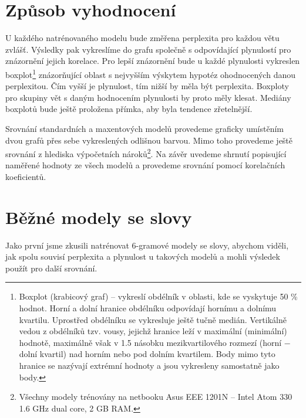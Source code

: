 \documentclass[12pt,a4paper]{report}
\begin{document}
\section{Způsob vyhodnocení}
U každého natrénovaného modelu bude změřena perplexita pro každou větu zvlášť. Výsledky pak vykreslíme do grafu společně s odpovídající plynulostí pro znázornění jejich korelace. Pro lepší znázornění bude u každé plynulosti vykreslen box\-plot\footnote{Box\-plot (krabicový graf) -- vykreslí obdélník v oblasti, kde se vyskytuje 50 \% hodnot. Horní a dolní hranice obdélníku odpovídají hornímu a dolnímu kvartilu. Uprostřed obdélníku se vykresluje ještě tučně medián. Vertikálně vedou z obdélníků tzv. vousy, jejichž hranice leží v maximální (minimální) hodnotě, maximálně však v 1.5 násobku mezikvartilového rozmezí (horní $-$ dolní kvartil) nad horním nebo pod dolním kvartilem. Body mimo tyto hranice se nazývají extrémní hodnoty a jsou vykresleny samostatně jako body.} znázorňující oblast s nejvyšším výskytem hypotéz ohodnocených danou perplexitou. Čím vyšší je plynulost, tím nižší by měla být perplexita. Box\-ploty pro skupiny vět s daným hodnocením plynulosti by proto měly klesat. Mediány box\-plotů bude ještě proložena přímka, aby byla tendence zřetelnější.

Srovnání standardních a maxentových modelů provedeme graficky umístěním dvou grafů přes sebe vykreslených odlišnou barvou. Mimo toho provedeme ještě srovnání z hlediska výpočetních nároků\footnote{Všechny modely trénovány na netbooku Asus EEE 1201N -- Intel Atom 330 1.6 GHz dual core, 2 GB RAM.}. Na závěr uvedeme shrnutí popisující naměřené hodnoty ze všech modelů a provedeme srovnání pomocí korelačních koeficientů.

\section{Běžné modely se slovy}
Jako první jsme zkusili natrénovat 6-gramové modely se slovy, abychom viděli, jak spolu souvisí perplexita a plynulost u takových modelů a mohli výsledek použít pro další srovnání.
\end{document}
